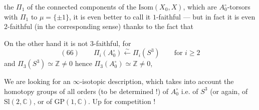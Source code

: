 the $\Pi_1$  of the connected components of the 
$\mathrm{Isom}(X_0,X)$, which are $A_0^\circ$-torsors
 with $\Pi_1$  to $\mu=\{\pm1\}$, it is
even better to call it $1$-faithful ---
but in fact it is even $2$-faithful
(in the corresponding sense) thanks to
the fact that

On the other hand it is not $3$-faithful, for
\[
(66)\qquad \Pi_i(A_0^\circ)\xleftarrow{\sim}\Pi_i(S^3)
\qquad\text{for }i\geq2
\]
and $\Pi_3(S^3)\simeq\mathbb Z\ne0$ hence $\Pi_3(A_0^\circ)\simeq\mathbb Z\ne0$,

We are looking for an $\infty$-isotopic description,
which takes into account the homotopy groups
of all orders (to be determined !) of
$A_0^\circ$ i.e. of $S^3$ (or again, of $\mathrm{Sl}(2,\mathbb C)$,
or of $\mathrm{GP}(1,\mathbb C)$. Up for competition !

